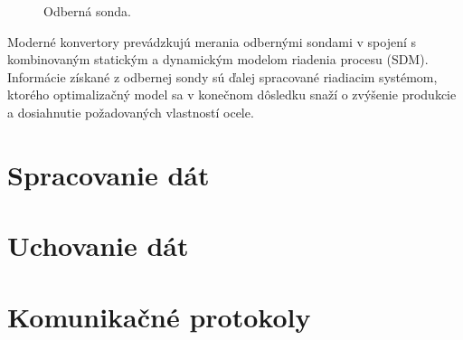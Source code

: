 \documentclass[]{tukediphc}
\begin{document}
\begin{figure}[!ht]
	\centering
	\qquad
	\caption{Odberná sonda.}
\end{figure}

Moderné konvertory prevádzkujú merania odbernými sondami v spojení s kombinovaným statickým a dynamickým modelom riadenia procesu (SDM). Informácie získané z odbernej sondy sú ďalej spracované riadiacim systémom, ktorého optimalizačný model sa v konečnom dôsledku snaží o zvýšenie produkcie a dosiahnutie požadovaných vlastností ocele.

\section{Spracovanie dát}

\section{Uchovanie dát}


\section{Komunikačné protokoly}
\end{document}
